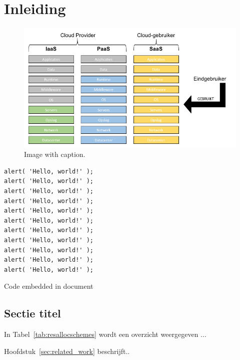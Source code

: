 \chapter{Inleiding}
\label{chap:intro}

\lipsum[66]

\begin{figure}[h]
	\centering
	\includegraphics[width=\textwidth]{images/cloud_rollen.png}
	\caption{Image with caption.}
	\label{fig:cloud_rollen}
\end{figure}

\lipsum[67-68]

\begin{listing}[!h]
\begin{verbatim}
alert( 'Hello, world!' );
alert( 'Hello, world!' );
alert( 'Hello, world!' );
alert( 'Hello, world!' );
alert( 'Hello, world!' );
alert( 'Hello, world!' );
alert( 'Hello, world!' );
alert( 'Hello, world!' );
alert( 'Hello, world!' );
alert( 'Hello, world!' );
alert( 'Hello, world!' );
\end{verbatim}
\caption{Code embedded in document}
\end{listing}

\lipsum[68]

\section{Sectie titel}

In Tabel~\ref{tab:resallocschemes} wordt een overzicht weergegeven ...

\begin{table}[h]
	\centering
	\captionsetup{justification=centering}
	\caption[Overzicht resource-allocatieschema's]{Overzicht resource-allocatieschema's}
	\label{tab:resallocschemes}
\end{table}

\lipsum[66-68]

Hoofdstuk~\ref{sec:related_work} beschrijft..
